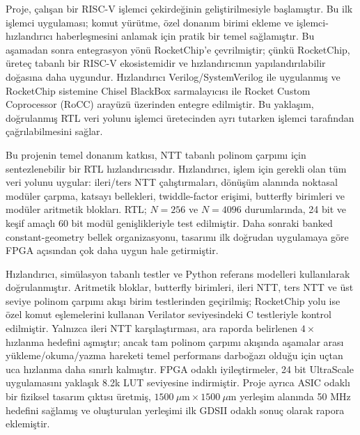 \documentclass[a4paper, 12pt, titlepage]{article}
\begin{document}
Proje, çalışan bir RISC-V işlemci çekirdeğinin geliştirilmesiyle başlamıştır. Bu ilk işlemci uygulaması; komut yürütme, özel donanım birimi ekleme ve işlemci-hızlandırıcı haberleşmesini anlamak için pratik bir temel sağlamıştır. Bu aşamadan sonra entegrasyon yönü RocketChip’e çevrilmiştir; çünkü RocketChip, üreteç tabanlı bir RISC-V ekosistemidir ve hızlandırıcının yapılandırılabilir doğasına daha uygundur. Hızlandırıcı Verilog/SystemVerilog ile uygulanmış ve RocketChip sistemine Chisel BlackBox sarmalayıcısı ile Rocket Custom Coprocessor (RoCC) arayüzü üzerinden entegre edilmiştir. Bu yaklaşım, doğrulanmış RTL veri yolunu işlemci üretecinden ayrı tutarken işlemci tarafından çağrılabilmesini sağlar.

Bu projenin temel donanım katkısı, NTT tabanlı polinom çarpımı için sentezlenebilir bir RTL hızlandırıcısıdır. Hızlandırıcı, işlem için gerekli olan tüm veri yolunu uygular: ileri/ters NTT çalıştırmaları, dönüşüm alanında noktasal modüler çarpma, katsayı bellekleri, twiddle-factor erişimi, butterfly birimleri ve modüler aritmetik blokları. RTL; \(N=256\) ve \(N=4096\) durumlarında, 24 bit ve keşif amaçlı 60 bit modül genişlikleriyle test edilmiştir. Daha sonraki banked constant-geometry bellek organizasyonu, tasarımı ilk doğrudan uygulamaya göre FPGA açısından çok daha uygun hale getirmiştir.

Hızlandırıcı, simülasyon tabanlı testler ve Python referans modelleri kullanılarak doğrulanmıştır. Aritmetik bloklar, butterfly birimleri, ileri NTT, ters NTT ve üst seviye polinom çarpımı akışı birim testlerinden geçirilmiş; RocketChip yolu ise özel komut eşlemelerini kullanan Verilator seviyesindeki C testleriyle kontrol edilmiştir. Yalnızca ileri NTT karşılaştırması, ara raporda belirlenen \(4\times\) hızlanma hedefini aşmıştır; ancak tam polinom çarpımı akışında aşamalar arası yükleme/okuma/yazma hareketi temel performans darboğazı olduğu için uçtan uca hızlanma daha sınırlı kalmıştır. FPGA odaklı iyileştirmeler, 24 bit UltraScale uygulamasını yaklaşık 8.2k LUT seviyesine indirmiştir. Proje ayrıca ASIC odaklı bir fiziksel tasarım çıktısı üretmiş, \(1500~\mu\mathrm{m} \times 1500~\mu\mathrm{m}\) yerleşim alanında 50 MHz hedefini sağlamış ve oluşturulan yerleşimi ilk GDSII odaklı sonuç olarak rapora eklemiştir.


\newpage
\tableofcontents
\newpage

\end{document}
